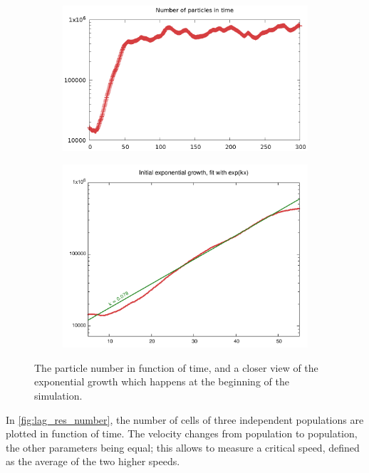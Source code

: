 \begin{figure}[h]
    \centering  
    \begin{subfigure}[b]{\textwidth}
        \includegraphics[width=\textwidth]{data/3D_model/run2/number_type1_log}
        \caption{}
        \label{fig:lagr_v0_k0_number}
    \end{subfigure}
    \begin{subfigure}[b]{\textwidth}
        \includegraphics[width=\textwidth]{data/3D_model/run2/number_type1_log_zoom}
        \caption{}
        \label{fig:lagr_v0_k0_number_zoom}
    \end{subfigure}
    \caption{The particle number in function of time, and a closer view of the exponential growth which happens at the beginning of the simulation.}
    \label{fig:lagr_v0_k0_numbers}
\end{figure}

In \autoref{fig:lag_res_number}, the number of cells of three independent populations are plotted in function of time. The velocity changes from population to population, the other parameters being equal; this allows to measure a critical speed, defined as the average of the two higher speeds.

